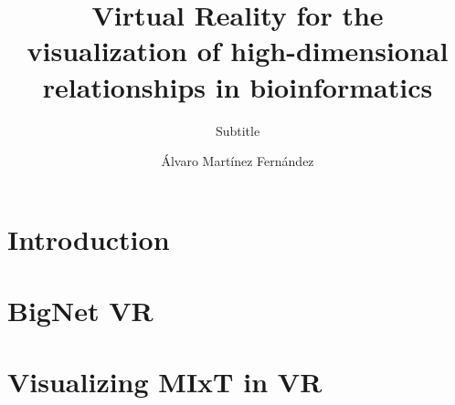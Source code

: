 \documentclass[USenglish]{uit-thesis}
\begin{document}

\title{Virtual Reality for the visualization of high-dimensional relationships in bioinformatics}
\subtitle{Subtitle}%
\author{\'Alvaro Mart\'inez Fern\'andez}

\maketitle

\frontmatter

\iffalse
\begin{dedication}
To...

Thanks for...
\end{dedication}


\begin{epigraph}
\epigraphitem{Simplicity is prerequisite for reliability.}{Edsger Dijkstra}
\epigraphitem{Beware of bugs in the above code;\\I have only proved it correct, not tried it.}{Donald Knuth}
\end{epigraph}

\begin{abstract}
This is the abstract, blah blah blah.
\end{abstract}

\begin{acknowledgement}
Thank you for blah blah blah
\end{acknowledgement}
\fi

\tableofcontents

\mainmatter

\chapter{Introduction}


\chapter{BigNet VR}


\chapter{Visualizing MIxT in VR}

\end{document}
